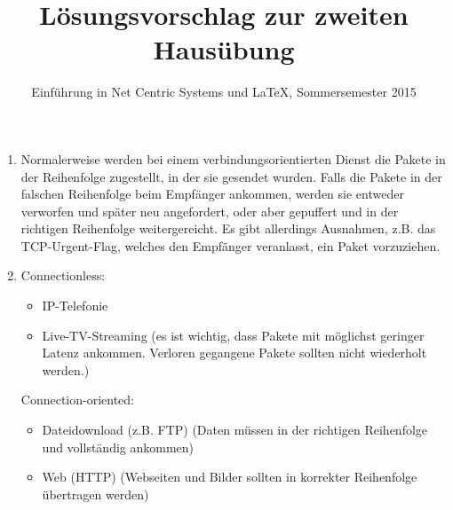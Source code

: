 \documentclass[a4paper,
			llpt,
			solution,
			accentcolor=tud2d,
			colorbacktitle
			]
			{tudexercise}
\title{Lösungsvorschlag zur zweiten Hausübung}
\subtitle{Einführung in Net Centric Systems und \LaTeX, Sommersemester 2015}
\begin{document}
\maketitle
\section{}


\begin{enumerate}

\item
Normalerweise werden bei einem verbindungsorientierten Dienst die Pakete in der Reihenfolge zugestellt, in der sie gesendet wurden. Falls die Pakete in der falschen Reihenfolge beim Empfänger ankommen, werden sie entweder verworfen und später neu angefordert, oder aber gepuffert und in der richtigen Reihenfolge weitergereicht.
Es gibt allerdings Ausnahmen, z.B. das TCP-Urgent-Flag, welches den Empfänger veranlasst, ein Paket vorzuziehen.

\item
Connectionless:
\begin{itemize}
\item IP-Telefonie
\item Live-TV-Streaming
(es ist wichtig, dass Pakete mit möglichst geringer Latenz ankommen. Verloren gegangene Pakete sollten nicht wiederholt werden.)
\end{itemize}
Connection-oriented:
\begin{itemize}
\item Dateidownload (z.B. FTP)
(Daten müssen in der richtigen Reihenfolge und vollständig ankommen)
\item Web (HTTP)
(Webseiten und Bilder sollten in korrekter Reihenfolge übertragen werden)
\end{itemize}
\end{enumerate}
\end{document}

